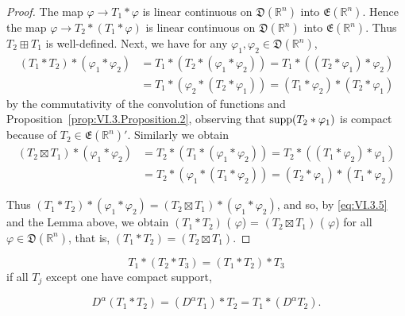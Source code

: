 \begin{proof}
 The map $\varphi \to T_1 * \varphi$ is linear continuous on $\mathfrak{D}(\mathbb{R}^{n})$ into $\mathfrak{E}(\mathbb{R}^{n})$. Hence the map $\varphi \to T_2 * (T_1 * \varphi)$ is linear continuous on $\mathfrak{D}(\mathbb{R}^{n})$ into $\mathfrak{E}(\mathbb{R}^{n})$. Thus $T_2 \boxplus T_1$ is well-defined. Next, we have for any $\varphi_1, \varphi_2 \in \mathfrak{D}(\mathbb{R}^{n})$, 
\[
\begin{aligned} (T _{1} * T _{2}) * (\varphi_{1} * \varphi_{2}) & = T _{1} * (T _{2} * (\varphi_{1} * \varphi_{2})) = T _{1} * ((T _{2} * \varphi_{1}) * \varphi_{2}) \\ & = T _{1} * (\varphi_{2} * (T _{2} * \varphi_{1})) = (T _{1} * \varphi_{2}) * (T _{2} * \varphi_{1}) \end{aligned}
\]
by the commutativity of the convolution of functions and Proposition~\ref{prop:VI.3.Proposition.2}, observing that $\operatorname{supp}(T_2 * \varphi_1)$ is compact because of $T_2 \in \mathfrak{E}(\mathbb{R}^{n})'$. Similarly we obtain 
\[ \begin{aligned} (T _{2} \boxtimes T _{1}) * (\varphi_{1} * \varphi_{2}) & = T _{2} * (T _{1} * (\varphi_{1} * \varphi_{2})) = T _{2} * ((T _{1} * \varphi_{2}) * \varphi_{1}) \\ & = T _{2} * (\varphi_{1} * (T _{1} * \varphi_{2})) = (T _{2} * \varphi_{1}) * (T _{1} * \varphi_{2}) \end{aligned}
\]

Thus $(T_{1} * T_{2}) * (\varphi_{1} * \varphi_{2}) = (T_{2} \boxtimes T_{1}) * (\varphi_{1} * \varphi_{2})$, and so, by \eqref{eq:VI.3.5} and the Lemma above, we obtain $(T_{1} * T_{2})$ ( $\varphi$) = $(T_{2} \boxtimes T_{1})$ ( $\varphi$) for all $\varphi \in \mathfrak{D}(\mathbb{R}^{n})$, that is, $(T_{1} * T_{2}) = (T_{2} \boxtimes T_{1})$. 
\end{proof}

\begin{corollaryu}
\begin{equation}\label{eq:VI.3.9}
T _{1} * (T _{2} * T _{3}) = (T _{1} * T _{2}) * T _{3}
\end{equation}
if all $T_{j}$ except one have compact support, 

\begin{equation}\label{eq:VI.3.10}
D ^{\alpha} (T _{1} * T _{2}) = (D ^{\alpha} T _{1}) * T _{2} = T _{1} * (D ^{\alpha} T _{2}).
\end{equation}
\end{corollaryu}

